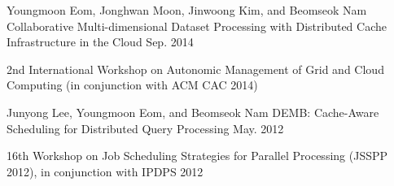 \begin{cventries}
\cventry
{Youngmoon Eom, Jonghwan Moon, Jinwoong Kim, and Beomseok Nam} %
{Collaborative Multi-dimensional Dataset Processing with Distributed Cache Infrastructure in the Cloud} %
{} %
{Sep. 2014} %
{ %
\begin{cvitems}
\item {2nd International Workshop on Autonomic Management of Grid and Cloud Computing (in conjunction with ACM CAC 2014)}
\end{cvitems}
}

\cventry
{Junyong Lee, Youngmoon Eom, and Beomseok Nam} %
{DEMB: Cache-Aware Scheduling for Distributed Query Processing} %
{} %
{May. 2012} %
{ %
\begin{cvitems}
\item {16th Workshop on Job Scheduling Strategies for Parallel Processing (JSSPP 2012), in conjunction with IPDPS 2012}
\end{cvitems}
}


\end{cventries}
